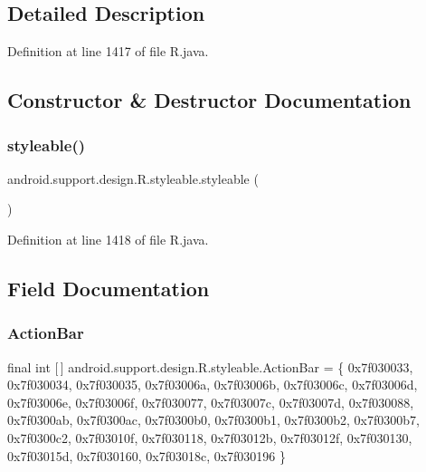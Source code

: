 \subsection{Detailed Description}


Definition at line 1417 of file R.\+java.



\subsection{Constructor \& Destructor Documentation}
\mbox{\label{classandroid_1_1support_1_1design_1_1_r_1_1styleable_a462dbfacb7fa5a21df9e1e562f6ac09e}} 
\subsubsection{\texorpdfstring{styleable()}{styleable()}}
{\footnotesize\ttfamily android.\+support.\+design.\+R.\+styleable.\+styleable (\begin{DoxyParamCaption}{ }\end{DoxyParamCaption})\hspace{0.3cm}{\ttfamily [private]}}



Definition at line 1418 of file R.\+java.


\begin{DoxyCode}{0}

\end{DoxyCode}


\subsection{Field Documentation}
\mbox{\label{classandroid_1_1support_1_1design_1_1_r_1_1styleable_ab795220a96557d11f8c21359b95bed82}} 
\subsubsection{\texorpdfstring{ActionBar}{ActionBar}}
{\footnotesize\ttfamily final int \mbox{[}$\,$\mbox{]} android.\+support.\+design.\+R.\+styleable.\+Action\+Bar = \{ 0x7f030033, 0x7f030034, 0x7f030035, 0x7f03006a, 0x7f03006b, 0x7f03006c, 0x7f03006d, 0x7f03006e, 0x7f03006f, 0x7f030077, 0x7f03007c, 0x7f03007d, 0x7f030088, 0x7f0300ab, 0x7f0300ac, 0x7f0300b0, 0x7f0300b1, 0x7f0300b2, 0x7f0300b7, 0x7f0300c2, 0x7f03010f, 0x7f030118, 0x7f03012b, 0x7f03012f, 0x7f030130, 0x7f03015d, 0x7f030160, 0x7f03018c, 0x7f030196 \}\hspace{0.3cm}{\ttfamily [static]}}



